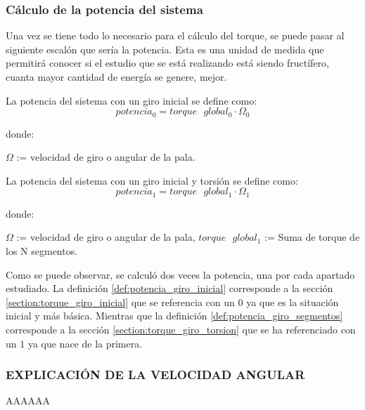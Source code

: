  
 \subsubsection{Cálculo de la potencia del sistema}
 
 Una vez se tiene todo lo necesario para el cálculo del torque, se puede pasar al siguiente escalón que sería la potencia. Esta es una unidad de medida que permitirá conocer si el estudio que se está realizando está siendo fructífero, cuanta mayor cantidad de energía se genere, mejor.
 
  \begin{definicion}
 La potencia del sistema con un giro inicial se define como:
 $$ potencia_0 = torque \text{ } global_0 \cdot \Omega_0 $$ 
 
 donde:
 
  \centering $\Omega$ := velocidad de giro o angular de la pala.
 \label{def:potencia_giro_inicial}
 \end{definicion}
 
   \begin{definicion}
 La potencia del sistema con un giro inicial y torsión se define como:
 $$ potencia_1 = torque \text{ } global_1 \cdot \Omega_1 $$ 
 
 donde:
 
  \centering $\Omega$ := velocidad de giro o angular de la pala,\hspace{7} $torque \text{ } global_1$ := Suma de torque de los N segmentos.
 \label{def:potencia_giro_segmentos}
 \end{definicion}
 
 Como se puede observar, se calculó dos veces la potencia, una por cada apartado estudiado. La definición \ref{def:potencia_giro_inicial} corresponde a la sección \ref{section:torque_giro_inicial} que se referencia con un $0$ ya que es la situación inicial y más básica. Mientras que la definición \ref{def:potencia_giro_segmentos} corresponde a la sección \ref{section:torque_giro_torsion} que se ha referenciado con un $1$ ya que nace de la primera.
 
 
 
\subsubsection{EXPLICACIÓN DE LA VELOCIDAD ANGULAR}
 
 
 
 AAAAAA \vspace{400}
 
